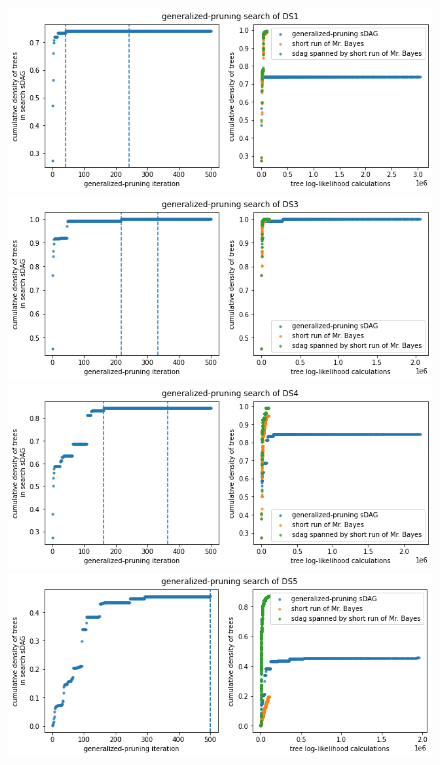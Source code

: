 \documentclass{article}
\begin{document}
\vspace{-8ex}
\begin{figure}[!b]\centering
\includegraphics[scale=0.4]{figures/gp_ds1_pp.png}
\includegraphics[scale=0.4]{figures/gp_ds3_pp.png}
\includegraphics[scale=0.4]{figures/gp_ds4_pp.png}
\includegraphics[scale=0.4]{figures/gp_ds5_pp.png}
\clearpage
\end{figure}
\end{document}
